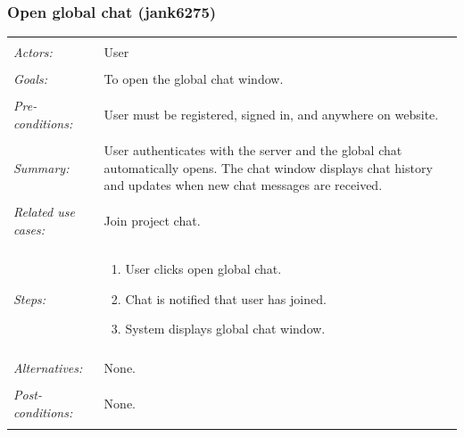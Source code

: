 \documentclass[11pt]{report}
\begin{document}
\subsubsection{Open global chat (jank6275)}
\begin{tabular}{ p{2cm} p{12cm} }
 \hline
 \\
 \textit{Actors:} & User \\ 
 \\
 \textit{Goals:} & To open the global chat window. \\
 \\
 \textit{Pre-conditions:} & User must be registered, signed in, and anywhere on website.  \\
 \\
 \textit{Summary:} & User authenticates with the server and the global chat automatically opens. The chat window displays chat history and updates when new chat messages are received.  \\ 
 \\
 \textit{Related use cases:} & Join project chat. \\ 
 \\
 \textit{Steps:} & \begin{enumerate}
  \item User clicks open global chat.
  \item Chat is notified that user has joined.
  \item System displays global chat window.
 \end{enumerate} \\
 \\
 \textit{Alternatives:} & None. \\
 \\
 \textit{Post-conditions:} & None. \\
 \\
\hline
\end{tabular}
\end{document}
